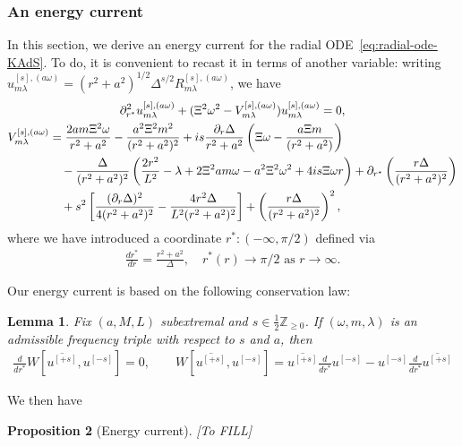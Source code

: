 \documentclass[11pt]{article}
\newtheorem{proposition}{Proposition}[section]
\newtheorem{lemma}[proposition]{Lemma}
\numberwithin{equation}{section}
\begin{document}
\subsubsection{An energy current}

In this section, we derive an energy current for the radial ODE~\eqref{eq:radial-ode-KAdS}. To do, it is convenient to recast it in terms of another variable: writing $u^{[s],(a\omega)}_{m\lambda}= (r^2+a^2)^{1/2}\Delta^{s/2}R^{[s],(a\omega)}_{m\lambda}$, we have
\begin{gather}
    \partial_{r^*}^2 u^{[s],(a\omega)}_{m\lambda} + (\Xi^2\omega^2-V^{[s],(a\omega)}_{m\lambda})u^{[s],(a\omega)}_{m\lambda}=0,  \label{eq:radial-ode-u-KAdS}\\
    \begin{aligned}
    V^{[s],(a\omega)}_{m\lambda}&= \frac{2am\Xi^2\omega}{r^2+a^2}
-\frac{a^2\Xi^2m^2}{(r^2+a^2)^2}+is\frac{\partial_r\Delta}{r^2+a^2}\left(
\Xi\omega
-\frac{a\Xi m}{(r^2+a^2)}
\right)\\
&\quad-\frac{\Delta}{(r^2+a^2)^2}\left(
\frac{2 r^2}{L^2}
-\lambda+2\Xi^2am\omega-a^2\Xi^2\omega^2
+4is\Xi\omega r\right)
+\partial_{r^*}\left(\frac{r\Delta}{(r^2+a^2)^2}\right)\\
&\quad
+s^2\left[
\frac{(\partial_r\Delta)^2}{4(r^2+a^2)^2}
-\frac{4r^2\Delta}{L^2(r^2+a^2)^2}
\right] +\left(\frac{r\Delta}{(r^2+a^2)^2}\right)^2,
\end{aligned}\notag
\end{gather}
where we have introduced a coordinate $r^*\colon (-\infty, \pi/2)$ defined via
\begin{align*}
    \frac{dr^*}{dr}=\frac{r^2+a^2}{\Delta}, \quad r^*(r)\to \pi/2 \text{~as $r\to \infty$.}
\end{align*}

Our energy current is based on the following conservation law:

\begin{lemma}\label{lem:Wronskian-conservation-KAdS} Fix $(a,M,L)$ subextremal and $s\in\frac12\mathbb Z_{\geq 0}$. If $(\omega,m,\lambda)$ is an admissible frequency triple with respect to $s$ and $a$, then
\begin{align*}
\frac{d}{dr^*}W[\overline{u^{[+s]}},u^{[-s]}]=0, \qquad W[\overline{u^{[+s]}},u^{[-s]}]= \overline{u^{[+s]}}\frac{d}{dr^*}u^{[-s]}- u^{[-s]}\frac{d}{dr^*}\overline{u^{[+s]}}
\end{align*}
\end{lemma}

We then have
\begin{proposition}[Energy current] 
[To FILL]
\end{proposition}
\end{document}
